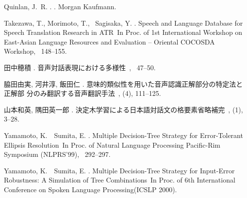 \begin{thebibliography}{}
Quinlan, J.~R. \BBCP.
.
\newblock Morgan Kaufmann.

Takezawa, T., Morimoto, T., \BBA\ Sagisaka, Y. \BBCP.
\newblock \BBOQ Speech and Language Database for Speech Translation Research in
  {ATR}\BBCQ\
\newblock In {\Bem Proc. of 1st International Workshop on East-Asian Language
  Resources and Evaluation -- Oriental COCOSDA Workshop}, \BPGS\ 148--155.

田中穂積 \BBCP.
\newblock \JBOQ 音声対話表現における多様性\JBCQ\
\newblock {}, \BPGS\ 47--50.

脇田由実, 河井淳, 飯田仁 \BBCP.
\newblock \JBOQ 意味的類似性を用いた音声認識正解部分の特定法と正解部
  分のみ翻訳する音声翻訳手法\JBCQ\
\newblock {}, {}  (4), 111--125.

山本和英, 隅田英一郎 \BBOP 1999\BBCP.
\newblock \JBOQ 決定木学習による日本語対話文の格要素省略補完\JBCQ\
\newblock {}, {}  (1), 3--28.

Yamamoto, K.\BBACOMMA\  \BBA\ Sumita, E. \BBCP.
\newblock \BBOQ Multiple Decision-Tree Strategy for Error-Tolerant Ellipsis
  Resolution\BBCQ\
\newblock In {\Bem Proc. of Natural Language Processing Pacific-Rim Symposium
  (NLPRS'99)}, \BPGS\ 292--297.

Yamamoto, K.\BBACOMMA\  \BBA\ Sumita, E. \BBOP 2000\BBCP.
\newblock \BBOQ Multiple Decision-Tree Strategy for Input-Error Robustness: A
  Simulation of Tree Combinations\BBCQ\
\newblock In {\Bem Proc. of 6th International Conference on Spoken Language
  Processing(ICSLP 2000)}.

\end{thebibliography}



